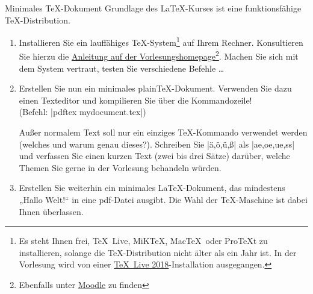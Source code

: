 \documentclass[
	vorläufig=false, 
	blattnr=0,
	ausgabe=2021-10-20,
	abgabe=2021-10-27,
	lösung=false,
	shortverb,
]{../tex/latexkurs-exercise}
\begin{document}
\begin{abstract}
	\noindent Achtung: Da die Installation der \TeX-Distribution grundlegend für den Kurs ist,
	muss die Abgabe für dieses Blatt von jedem einzeln bearbeitet werden. \\
	\emph{Keine Gruppenabgabe!}
\end{abstract}

\begin{aufgabe}[12]{Minimales \TeX-Dokument}
	Grundlage des \LaTeX-Kurses ist eine funktionsfähige \TeX-Distribution. 
	\begin{enumerate}[label=\alph*)]
		\item Installieren Sie ein lauffähiges \TeX-System\footnote{ Es steht Ihnen frei, \TeX~Live, MiK\TeX, Mac\TeX~oder Pro\TeX t zu installieren, solange die \TeX-Distribution nicht älter als ein Jahr ist. In der Vorlesung wird von einer \href{http://www.tug.org/texlive/}{\TeX~Live 2018}-Installation ausgegangen.} auf Ihrem Rechner. Konsultieren Sie hierzu die \href{http://latexkurs.github.io/exercises/00_texlive_installation.pdf}{Anleitung auf der Vorlesungshomepage}\footnote{Ebenfalls unter \href{https://moodle.uni-heidelberg.de/course/view.php?id=9677}{Moodle} zu finden}. Machen Sie sich mit dem System vertraut, testen Sie verschiedene Befehle …

		\item \label{aufg:texdoc} Erstellen Sie nun ein minimales plain\TeX-Dokument. Verwenden Sie dazu einen Texteditor und kompilieren Sie über die Kommandozeile! \\(Befehl: |pdftex mydocument.tex|)

		Außer normalem Text soll nur ein einziges \TeX-Kommando verwendet werden (welches und warum genau dieses?). Schreiben Sie |ä,ö,ü,ß| als |ae,oe,ue,ss| und verfassen Sie einen kurzen Text (zwei bis drei Sätze) darüber, welche Themen Sie gerne in der Vorlesung behandeln würden.

		\item \label{aufg:latexdoc} Erstellen Sie weiterhin ein minimales \LaTeX-Dokument, das mindestens „Hallo Welt!“ in eine pdf-Datei ausgibt. Die Wahl der \TeX-Maschine ist dabei Ihnen überlassen.
	\end{enumerate}
\end{aufgabe}


\end{document}

